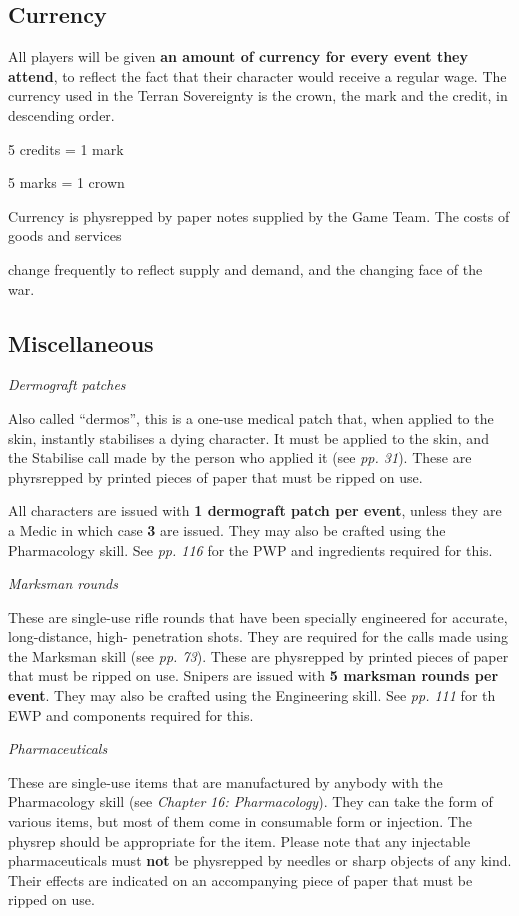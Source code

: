\documentclass{scrbook}
\begin{document}
\subsection{Currency}

All players will be given \textbf{an amount of currency for every event they attend}, to reflect the fact that their character would receive a regular wage. The currency used in the Terran Sovereignty is the crown, the mark and the credit, in descending order.

5 credits = 1 mark

5 marks = 1 crown

Currency is physrepped by paper notes supplied by the Game Team. The costs of goods and services

change frequently to reflect supply and demand, and the changing face of the war.

\subsection{Miscellaneous}

\textit{Dermograft patches}

Also called ``dermos'', this is a one-use medical patch that, when applied to the skin, instantly stabilises a dying character. It must be applied to the skin, and the Stabilise call made by the person who applied it (see \textit{pp. 31}). These are phyrsrepped by printed pieces of paper that must be ripped on use.

All characters are issued with \textbf{1 dermograft patch per event}, unless they are a Medic in which case \textbf{3} are issued. They may also be crafted using the Pharmacology skill. See \textit{pp. 116} for the PWP and ingredients required for this.

\textit{Marksman rounds}

These are single-use rifle rounds that have been specially engineered for accurate, long-distance, high- penetration shots. They are required for the calls made using the Marksman skill (see \textit{pp. 73}). These are physrepped by printed pieces of paper that must be ripped on use. Snipers are issued with \textbf{5 marksman rounds per event}. They may also be crafted using the Engineering skill. See \textit{pp. 111} for th EWP and components required for this.

\textit{Pharmaceuticals}

These are single-use items that are manufactured by anybody with the Pharmacology skill (see \textit{Chapter} \textit{16: Pharmacology}). They can take the form of various items, but most of them come in consumable form or injection. The physrep should be appropriate for the item. Please note that any injectable pharmaceuticals must \textbf{not} be physrepped by needles or sharp objects of any kind. Their effects are indicated on an accompanying piece of paper that must be ripped on use.
\end{document}
